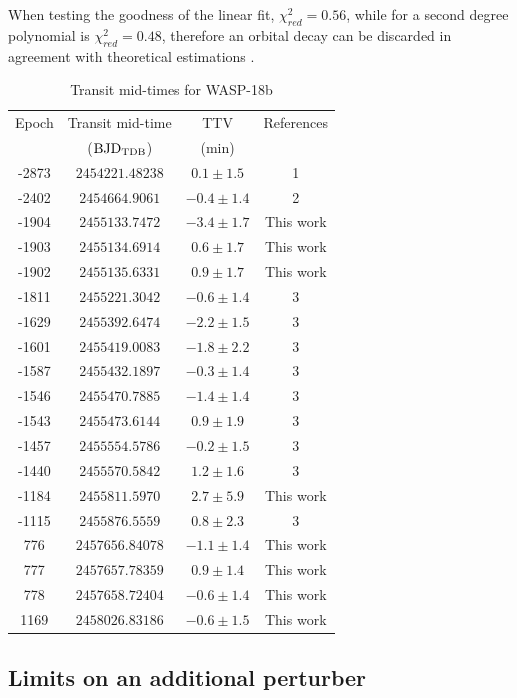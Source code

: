 When testing the goodness of the linear fit, $\chi^{2}_{red} =0.56$, while for a second degree polynomial is $\chi^{2}_{red}=0.48$, therefore an orbital decay can be discarded in agreement with theoretical estimations \citep{CollierCameron2018}.  


\begin{table}
\caption{Transit mid-times for WASP-18b}
\label{times_wasp18}
\begin{tabular}{cccc}
\hline \hline
Epoch & Transit mid-time & TTV & References\\
      & (${\rm BJD_{TDB}}$) & (min) & \\
\hline 
-2873 & $2454221.48238$ & $0.1\pm1.5$ & 1\\
-2402 & $2454664.9061$ & $-0.4\pm1.4$ & 2 \\
-1904 & $2455133.7472$ & $-3.4\pm1.7$ & This work \\
-1903 & $2455134.6914$ & $0.6\pm1.7$ & This work \\
-1902 & $2455135.6331$  & $0.9\pm1.7$  & This work \\
-1811 & $2455221.3042$ & $-0.6\pm1.4$  & 3\\
-1629 & $2455392.6474$ & $-2.2\pm1.5$& 3 \\
-1601 & $2455419.0083$ & $-1.8\pm2.2$& 3\\
-1587 & $2455432.1897$ & $-0.3\pm1.4$ & 3\\
-1546 & $2455470.7885$ & $-1.4\pm1.4$ & 3\\
-1543 & $2455473.6144$ & $0.9\pm1.9$& 3\\
-1457 & $2455554.5786$ & $-0.2\pm1.5$&3 \\
-1440 & $2455570.5842$ & $1.2\pm1.6$& 3\\
-1184 & $2455811.5970$ &  $2.7\pm5.9$ & This work  \\
-1115 & $2455876.5559$ & $0.8\pm2.3$ & 3 \\ 
776 & $2457656.84078$ & $-1.1\pm1.4$ & This work  \\
777 & $2457657.78359$   & $0.9\pm1.4$ & This work\\
778 & $2457658.72404$ & $-0.6\pm1.4$ & This work \\
1169 & $2458026.83186$ & $-0.6\pm1.5$ & This work  \\
\hline
\end{tabular}
\end{table} 

\subsection{Limits on an additional perturber}

